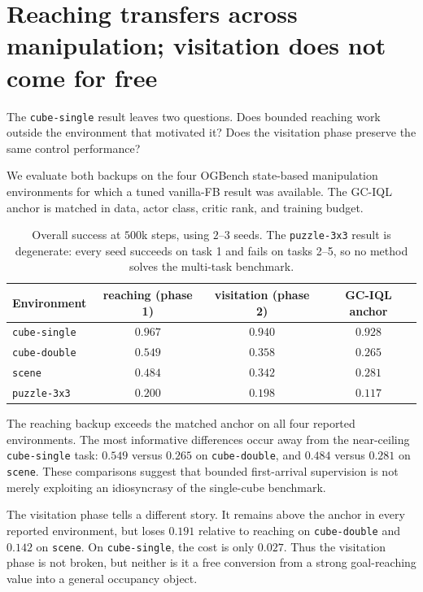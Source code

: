 \documentclass{article}
\begin{document}
\section{Reaching transfers across manipulation; visitation does not come for free}
\label{sec:suite}

The \texttt{cube-single} result leaves two questions. Does bounded reaching work
outside the environment that motivated it? Does the visitation phase preserve the
same control performance?

We evaluate both backups on the four OGBench state-based manipulation environments
for which a tuned vanilla-FB result was available. The GC-IQL anchor is matched in
data, actor class, critic rank, and training budget.

\begin{table}[t]
\centering\small
\begin{tabular}{l c c c}
\toprule
Environment & reaching (phase 1) & visitation (phase 2) & GC-IQL anchor \\
\midrule
\texttt{cube-single} & $\mathbf{0.967}$ & $0.940$ & $0.928$ \\
\texttt{cube-double} & $\mathbf{0.549}$ & $0.358$ & $0.265$ \\
\texttt{scene}       & $\mathbf{0.484}$ & $0.342$ & $0.281$ \\
\texttt{puzzle-3x3}  & $0.200$ & $0.198$ & $0.117$ \\
\bottomrule
\end{tabular}
\caption{Overall success at $500$k steps, using $2$--$3$ seeds. The
\texttt{puzzle-3x3} result is degenerate: every seed succeeds on task 1 and fails
on tasks 2--5, so no method solves the multi-task benchmark.}
\label{tab:suite}
\end{table}

The reaching backup exceeds the matched anchor on all four reported environments.
The most informative differences occur away from the near-ceiling
\texttt{cube-single} task: $0.549$ versus $0.265$ on \texttt{cube-double}, and
$0.484$ versus $0.281$ on \texttt{scene}. These comparisons suggest that bounded
first-arrival supervision is not merely exploiting an idiosyncrasy of the
single-cube benchmark.

The visitation phase tells a different story. It remains above the anchor in every
reported environment, but loses $0.191$ relative to reaching on
\texttt{cube-double} and $0.142$ on \texttt{scene}. On \texttt{cube-single}, the
cost is only $0.027$. Thus the visitation phase is not broken, but neither is it a
free conversion from a strong goal-reaching value into a general occupancy
object.
\end{document}
